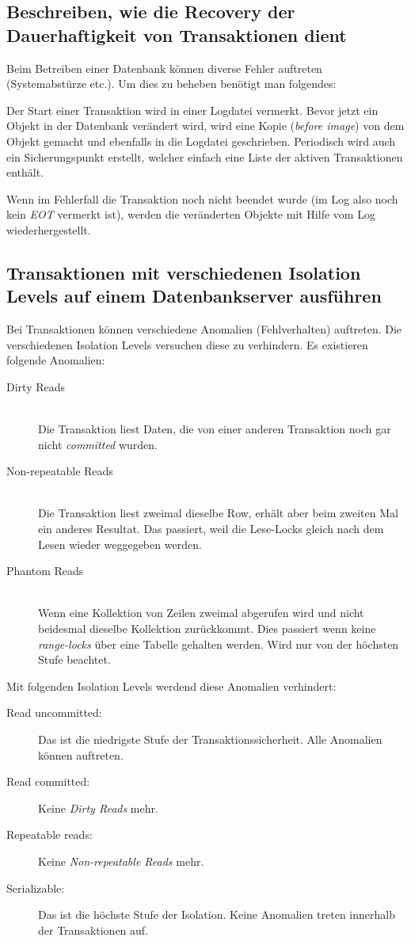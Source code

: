 \subsection{Beschreiben, wie die Recovery der Dauerhaftigkeit von Transaktionen dient}

Beim Betreiben einer Datenbank können diverse Fehler auftreten (Systemabstürze etc.). Um dies zu beheben benötigt man folgendes:

Der Start einer Transaktion wird in einer Logdatei vermerkt. Bevor jetzt ein Objekt in der Datenbank verändert wird, wird eine Kopie (\emph{before image}) von dem Objekt gemacht und ebenfalls in die Logdatei geschrieben. Periodisch wird auch ein Sicherungspunkt erstellt, welcher einfach eine Liste der aktiven Transaktionen enthält.

Wenn im Fehlerfall die Transaktion noch nicht beendet wurde (im Log also noch kein \emph{EOT} vermerkt ist), werden die veränderten Objekte mit Hilfe vom Log wiederhergestellt.

\subsection{Transaktionen mit verschiedenen Isolation Levels auf einem Datenbankserver ausführen}

Bei Transaktionen können verschiedene Anomalien (Fehlverhalten) auftreten. Die verschiedenen Isolation Levels versuchen diese zu verhindern. Es existieren folgende Anomalien:
\begin{description}
	\item[Dirty Reads] \hfill \\
	Die Transaktion liest Daten, die von einer anderen Transaktion noch gar nicht \emph{committed} wurden.
	\item[Non-repeatable Reads] \hfill \\
	Die Transaktion liest zweimal dieselbe Row, erhält aber beim zweiten Mal ein anderes Resultat. Das passiert, weil die Lese-Locks gleich nach dem Lesen wieder weggegeben werden.
	\item[Phantom Reads] \hfill \\
	Wenn eine Kollektion von Zeilen zweimal abgerufen wird und nicht beidesmal dieselbe Kollektion zurückkommt. Dies passiert wenn keine \emph{range-locks} über eine Tabelle gehalten werden. Wird nur von der höchsten Stufe beachtet.
\end{description}
Mit folgenden Isolation Levels werdend diese Anomalien verhindert:
\begin{description}
  \item[Read uncommitted:] Das ist die niedrigste Stufe der Transaktionssicherheit.  Alle Anomalien können auftreten.
  \item[Read committed:] Keine \emph{Dirty Reads} mehr. 
  \item[Repeatable reads:] Keine \emph{Non-repeatable Reads} mehr. 
  \item[Serializable:] Das ist die höchste Stufe der Isolation. Keine Anomalien treten innerhalb der Transaktionen auf.
\end{description}

